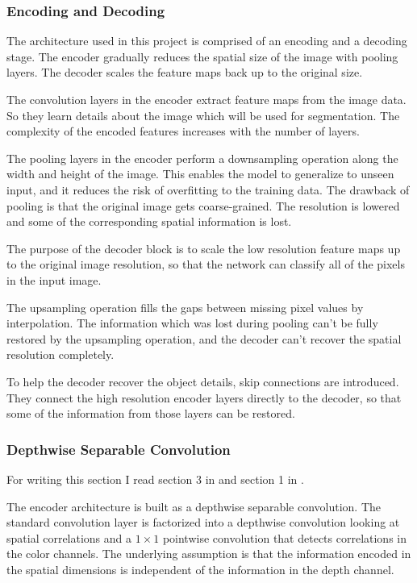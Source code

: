 \documentclass[11pt, onecolumn, oneside, reqno]{article}
\begin{document}
\subsubsection*{Encoding and Decoding}
The architecture used in this project is comprised of an encoding and a decoding stage. The encoder gradually reduces the spatial size of the image with pooling layers. The decoder scales the feature maps back up to the original size.

The convolution layers in the encoder extract feature maps from the image data. So they learn details about the image which will be used for segmentation. The complexity of the encoded features increases with the number of layers.

The pooling layers in the encoder perform a downsampling operation along the width and height of the image. This enables the model to generalize to unseen input, and it reduces the risk of overfitting to the training data. The drawback of pooling is that the original image gets coarse-grained. The resolution is lowered and some of the corresponding spatial information is lost.

The purpose of the decoder block is to scale the low resolution feature maps up to the original image resolution, so that the network can classify all of the pixels in the input image. 
 
The upsampling operation fills the gaps between missing pixel values by interpolation. The information which was lost during pooling can't be fully restored by the upsampling operation, and the decoder can't recover the spatial resolution completely.
 
To help the decoder recover the object details, skip connections are introduced. They connect the high resolution encoder layers directly to the decoder, so that some of the information from those layers can be restored.  

\subsubsection*{Depthwise Separable Convolution}
For writing this section I read section 3 in \cite{MobileNets} and section 1 in \cite{Xception}.

The encoder architecture is built as a depthwise separable convolution. The standard convolution layer is factorized into a depthwise convolution looking at spatial correlations and a $1 \times 1$ pointwise  convolution that detects correlations in the color channels. The underlying assumption is that the information encoded in the spatial dimensions is independent of the information in the depth channel.
\end{document}
